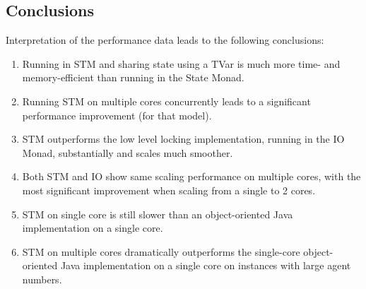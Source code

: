 \subsection{Conclusions}
Interpretation of the performance data leads to the following conclusions:
\begin{enumerate}
	\item Running in STM and sharing state using a TVar is much more time- and memory-efficient than running in the State Monad.
	\item Running STM on multiple cores concurrently leads to a significant performance improvement (for that model).
	\item STM outperforms the low level locking implementation, running in the IO Monad, substantially and scales much smoother.
	\item Both STM and IO show same scaling performance on multiple cores, with the most significant improvement when scaling from a single to 2 cores.
	\item STM on single core is still slower than an object-oriented Java implementation on a single core.
	\item STM on multiple cores dramatically outperforms the single-core object-oriented Java implementation on a single core on instances with large agent numbers.
\end{enumerate}